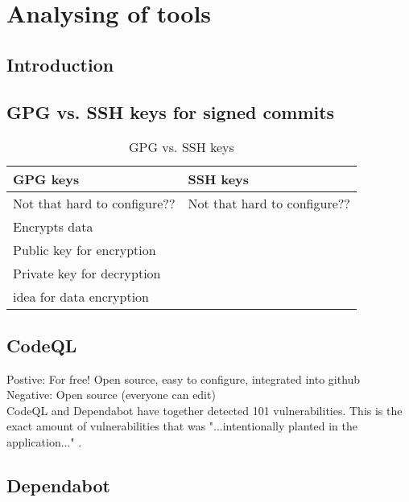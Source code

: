 \chapter{Analysing of tools}
\section{Introduction}

\section{GPG vs. SSH keys for signed commits}


\begin{table}[!ht]
    \centering
    \begin{tabular}{|p{}|p{}|}
    \hline
        \cellcolor{lightblue!} GPG keys  & \cellcolor{lightblue!} SSH keys \\ \hline
        Not that hard to configure?? &  Not that hard to configure??\\\hline
        Encrypts data &\\ \hline
        Public key for encryption &\\ \hline
        Private key for decryption &\\ \hline
        \acrshort{idea} for data encryption &\\ 
    \end{tabular}
    \caption{GPG vs. SSH keys}

\end{table}

\section{CodeQL}
Postive: For free! Open source, easy to configure, integrated into github
\\
Negative: Open source (everyone can edit)
\\
CodeQL and Dependabot have together detected 101 vulnerabilities. This is the exact amount of vulnerabilities that was "...intentionally planted in the application..." \cite{owaspJuiceShop}.

\section{Dependabot}
